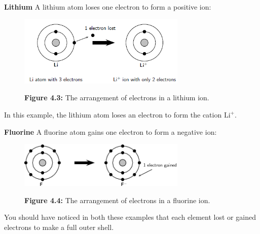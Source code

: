         \label{m38757*id260747}\noindent{}\textbf{Lithium}
A lithium atom loses one electron to form a positive ion:
    \setcounter{subfigure}{0}
	\begin{figure}[H] %
    \begin{center}
    \label{m38757*uid121!!!underscore!!!media}\label{m38757*uid121!!!underscore!!!printimage}\includegraphics[width=8cm]{col11305.imgs/m38757_CG10C3_012.png} %
      \vspace{2pt}
    \vspace{\rubberspace}\par \begin{cnxcaption}
	  \small \textbf{Figure 4.3: }The arrangement of electrons in a lithium ion.
	\end{cnxcaption}
    \vspace{.1in}
    \end{center}
 \end{figure}       
In this example, the lithium atom loses an electron to form the cation ${\mathrm{Li}}^{+}$.\par 
        \label{m38757*id260803}\noindent{}\textbf{Fluorine}
A fluorine atom gains one electron to form a negative ion:
    \setcounter{subfigure}{0}
	\begin{figure}[H] %
    \begin{center}
    \label{m38757*uid122!!!underscore!!!media}\label{m38757*uid122!!!underscore!!!printimage}\includegraphics[width=8cm]{col11305.imgs/m38757_CG10C3_013.png} %
      \vspace{2pt}
    \vspace{\rubberspace}\par \begin{cnxcaption}
	  \small \textbf{Figure 4.4: }The arrangement of electrons in a fluorine ion.
	\end{cnxcaption}
    \vspace{.1in}
    \end{center}
 \end{figure}       \par 
\label{m38757*eip-273}You should have noticed in both these examples that each element lost or gained electrons to make a full outer shell.\par \label{m38757*secfhsst!!!underscore!!!id842}

